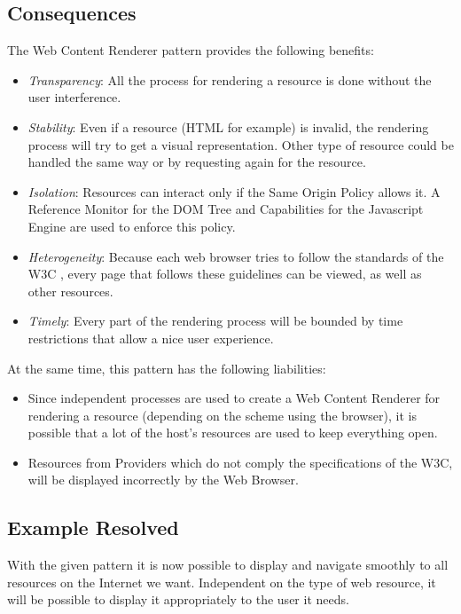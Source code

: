 \documentclass{sig-alternate-05-2015}
\begin{document}
  \subsection*{Consequences}
  The Web Content Renderer pattern provides the following benefits:
  \begin{itemize}
    \item \textit{Transparency}: All the process for rendering a resource is done without the user interference.
    \item \textit{Stability}: Even if a resource (HTML for example) is invalid, the rendering process will try to get a visual representation. Other type of resource could be handled the same way or by requesting again for the resource.
    \item \textit{Isolation}: Resources can interact only if the Same Origin Policy allows it. A Reference Monitor for the DOM Tree and Capabilities for the Javascript Engine are used to enforce this policy.
    \item \textit{Heterogeneity}: Because each web browser tries to follow the standards of the W3C \cite{w3c}, every page that follows these guidelines can be viewed, as well as other resources.
    \item \textit{Timely}: Every part of the rendering process will be bounded by time restrictions that allow a nice user experience.
  \end{itemize}
  At the same time, this pattern has the following liabilities:
  \begin{itemize}
    \item Since independent processes are used to create a Web Content Renderer for rendering a resource (depending on the scheme using the browser), it is possible that a lot of the host's resources are used to keep everything open.
    \item Resources from Providers which do not comply the specifications of the W3C, will be displayed incorrectly by the Web Browser.
  \end{itemize}

  \subsection*{Example Resolved}
With the given pattern it is now possible to display and navigate smoothly to all resources on the Internet we want. Independent on the type of web resource, it will be possible to display it appropriately to the user it needs. 
\end{document}
